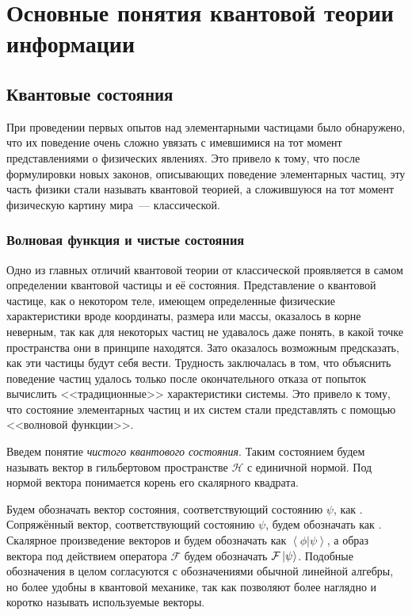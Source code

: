 \section{Основные понятия квантовой теории информации}
\subsection{Квантовые состояния}
При проведении первых опытов над элементарными частицами было обнаружено, что их поведение очень сложно увязать с имевшимися на тот момент представлениями о физических явлениях. Это привело к тому, что после формулировки новых законов, описывающих поведение элементарных частиц, эту часть физики стали называть квантовой теорией, а сложившуюся на тот момент физическую картину мира~--- классической.

\subsubsection{Волновая функция и чистые состояния}
Одно из главных отличий квантовой теории от классической проявляется в самом определении квантовой частицы и её состояния.
Представление о квантовой частице, как о некотором теле, имеющем определенные физические характеристики вроде координаты, размера или массы, оказалось в корне неверным, так как для некоторых частиц не удавалось даже понять, в какой точке пространства они в принципе находятся. Зато оказалось возможным предсказать, как эти частицы будут себя вести.
Трудность заключалась в том, что объяснить поведение частиц удалось только после окончательного отказа от попыток вычислить <<традиционные>> характеристики системы. Это привело к тому, что состояние элементарных частиц и их систем стали представлять с помощью <<волновой функции>>.

Введем понятие \textit{чистого квантового состояния}. 
Таким состоянием будем называть вектор в гильбертовом пространстве $\mathcal H$ с единичной нормой.
Под нормой вектора понимается корень его скалярного квадрата.

Будем обозначать вектор состояния, соответствующий состоянию $\psi$, как \state{\psi}. 
Сопряжённый вектор, соответствующий состоянию $\psi$, будем обозначать как \conjstate{\psi}. 
Скалярное произведение векторов \state{\psi}  и \conjstate{\phi}  будем обозначать как $\left\langle\phi|\psi\right\rangle$, 
а образ вектора \state{\psi} под действием оператора $\mathcal F$ будем обозначать $\mathcal F\left| \psi \right\rangle$. 
Подобные обозначения в целом согласуются с обозначениями обычной линейной алгебры, но более удобны в квантовой механике, так как позволяют более наглядно и коротко называть используемые векторы.


